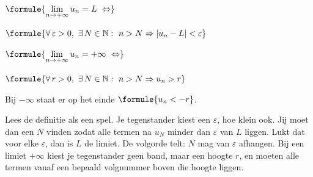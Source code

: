 \begin{theorie}
\begin{minipage}[t]{.57\linewidth}
\vspace{0pt}
$\formule{\displaystyle\lim_{n\to+\infty} u_n = L \ \Leftrightarrow}$

\vspace{.5mm}
$\formule{\forall\, \varepsilon > 0,\ \exists\, N \in \mathbb{N}: \ n > N \Rightarrow |u_n - L| < \varepsilon}$

\vspace{2.5mm}
$\formule{\displaystyle\lim_{n\to+\infty} u_n = +\infty \ \Leftrightarrow}$

\vspace{.5mm}
$\formule{\forall\, r > 0,\ \exists\, N \in \mathbb{N}: \ n > N \Rightarrow u_n > r}$

\vspace{2.5mm}
Bij $-\infty$ staat er op het einde $\formule{u_n < -r}$.
\end{minipage}\hfill
\begin{minipage}[t]{.4\linewidth}
\vspace{0pt}
\end{minipage}
\end{theorie}

Lees de definitie als een spel. Je tegenstander kiest een $\varepsilon$, hoe klein ook. Jij moet dan een $N$ vinden zodat alle termen na $u_N$ minder dan $\varepsilon$ van $L$ liggen. Lukt dat voor elke $\varepsilon$, dan is $L$ de limiet. De volgorde telt: $N$ mag van $\varepsilon$ afhangen. Bij een limiet $+\infty$ kiest je tegenstander geen band, maar een hoogte $r$, en moeten alle termen vanaf een bepaald volgnummer boven die hoogte liggen.

